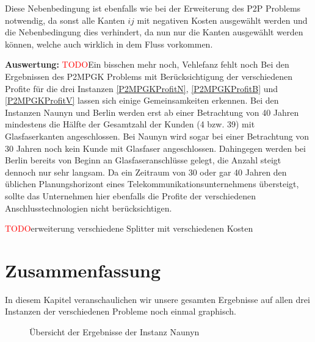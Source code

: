 \documentclass[11pt,a4paper]{article}
\newcommand{\TODO}{\textcolor{red}{TODO}}
\theoremstyle{my_th_style1}
\begin{document}
Diese Nebenbedingung ist ebenfalls wie bei der Erweiterung des P2P Problems notwendig, da sonst alle Kanten $ij$ mit negativen Kosten ausgewählt werden und die Nebenbedingung dies verhindert, da nun nur die Kanten ausgew\"ahlt werden können, welche auch wirklich in dem Fluss vorkommen.
 
 \textbf{Auswertung:} \TODO Ein bisschen mehr noch, Vehlefanz fehlt noch
 Bei den Ergebnissen des P2MPGK Problems mit Ber\"ucksichtigung der verschiedenen Profite f\"ur die drei Instanzen \eqref{P2MPGKProfitN}, \eqref{P2MPGKProfitB} und \eqref{P2MPGKProfitV} lassen sich einige Gemeinsamkeiten erkennen.
 Bei den Instanzen Naunyn und Berlin werden erst ab einer Betrachtung von 40 Jahren mindestens die H\"alfte der Gesamtzahl der Kunden (4 bzw. 39) mit Glasfaserkanten angeschlossen.
 Bei Naunyn wird sogar bei einer Betrachtung von 30 Jahren noch kein Kunde mit Glasfaser angeschlossen.
 Dahingegen werden bei Berlin bereits von Beginn an Glasfaseranschl\"usse gelegt, die Anzahl steigt dennoch nur sehr langsam.
 Da ein Zeitraum von 30 oder gar 40 Jahren den \"ublichen Planungshorizont eines Telekommunikationsunternehmens \"ubersteigt, sollte das Unternehmen hier ebenfalls die Profite der verschiedenen Anschlusstechnologien nicht ber\"ucksichtigen.
 
 \TODO erweiterung verschiedene Splitter mit verschiedenen Kosten
 
 \section{Zusammenfassung}
In diesem Kapitel veranschaulichen wir unsere gesamten Ergebnisse auf allen drei Instanzen der verschiedenen Probleme noch einmal graphisch.

  \begin{figure}[!htbp]
 	\caption{\"Ubersicht der Ergebnisse der Instanz Naunyn}
 \end{figure}
 
\end{document}
